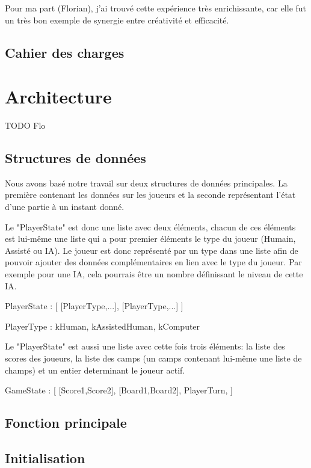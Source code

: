 \documentclass[]{article}
\begin{document}
Pour ma part (Florian), j'ai trouvé cette expérience très enrichissante, car elle fut un très bon exemple de synergie entre créativité et efficacité.

\subsection{Cahier des charges}

\section{Architecture}

TODO Flo

\subsection{Structures de données}

	Nous avons basé notre travail sur deux structures de données principales. La première contenant les données sur les joueurs et la seconde représentant l'état d'une partie à un instant donné.

Le "PlayerState" est donc une liste avec deux éléments, chacun de ces éléments est lui-même une liste qui a pour premier éléments le type du joueur (Humain, Assisté ou IA).
Le joueur est donc représenté par un type dans une liste afin de pouvoir ajouter des données complémentaires en lien avec le type du joueur. Par exemple pour une IA, cela pourrais être un nombre définissant le niveau de cette IA.

PlayerState : 
[
	[PlayerType,...],
	[PlayerType,...]
]

PlayerType :
kHuman, kAssistedHuman, kComputer

Le "PlayerState" est aussi une liste avec cette fois trois éléments: la liste des scores des joueurs, la liste des camps (un camps contenant lui-même une liste de champs) et un entier determinant le joueur actif.

GameState :
[
	[Score1,Score2],
	[Board1,Board2],
	PlayerTurn, 
]

\subsection{Fonction principale}



\subsection{Initialisation}
\end{document}
